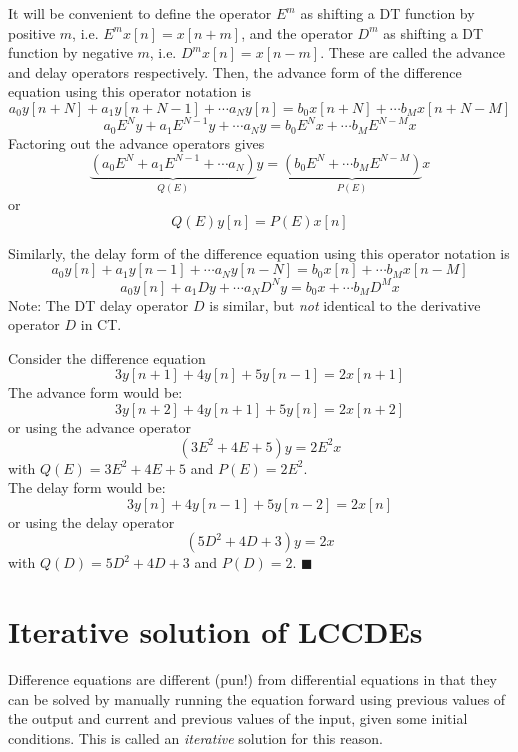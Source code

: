 It will be convenient to define the operator $E^m$ as shifting a DT function by positive $m$, i.e. $E^m x[n] = x[n+m]$, and the operator $D^m$ as shifting a DT function by negative $m$, i.e. $D^m x[n] = x[n-m]$. These are called the advance and delay operators respectively. Then, the advance form of the difference equation using this operator notation is
\[
a_0y[n+N] + a_1y[n+N-1] + \cdots a_N y[n] = b_0 x[n+N] + \cdots b_Mx[n+N-M]
\]
\[
a_0 E^Ny + a_1E^{N-1}y + \cdots a_N y = b_0 E^{N}x + \cdots b_M E^{N-M}x
\]
Factoring out the advance operators gives
\[
\underbrace{\left(a_0E^N + a_1E^{N-1} + \cdots a_N\right)}_{Q(E)} y = \underbrace{\left(b_0 E^{N} + \cdots b_M E^{N-M}\right)}_{P(E)} x
\]
or
\[
Q(E)y[n] = P(E)x[n]
\]

Similarly, the delay form of the difference equation using this operator notation is
\[
a_0y[n] + a_1y[n-1] + \cdots a_N y[n-N] = b_0 x[n] + \cdots b_Mx[n-M]
\]
\[
a_0y[n] + a_1 Dy + \cdots a_N D^N y = b_0 x + \cdots b_MD^M x
\]
Note: The DT delay operator $D$ is similar, but \emph{not} identical to the derivative operator $D$ in CT.

\begin{example}
  Consider the difference equation
  \[
  3y[n+1] + 4y[n] + 5y[n-1] = 2x[n+1]
  \]
  The advance form would be:
  \[
  3y[n+2] + 4y[n+1] + 5y[n] = 2x[n+2]
  \]
  or using the advance operator
  \[
  \left(3E^2 + 4E + 5\right)y = 2E^2x
  \]
  with $Q(E) = 3E^2 + 4E + 5$ and $P(E) = 2E^2$.\\[1em]
  The delay form would be:
  \[
  3y[n] + 4y[n-1] + 5y[n-2] = 2x[n]
  \]
  or using the delay operator
  \[
  \left(5D^2 + 4D + 3\right)y = 2x
  \]
  with $Q(D) = 5D^2 + 4D + 3$ and $P(D) = 2$.
$\blacksquare$
\end{example}

\section{Iterative solution of LCCDEs}

Difference equations are different (pun!) from differential equations in that they can be solved by manually running the equation forward using previous values of the output and current and previous values of the input, given some initial conditions. This is called an \emph{iterative} solution for this reason.

